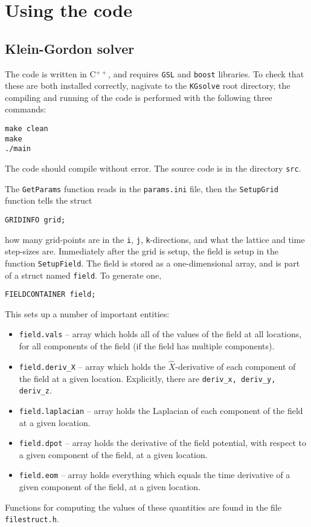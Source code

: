 \documentclass[amsmath,amssymb,12pt, eqsecnum]{revtex4}
\newcommand\codeRed[1]{\textcolor[rgb]{1,0,0}{{\tt #1}}}
\newcommand\codeBlue[1]{\textcolor[rgb]{0,0,1}{{\tt #1}}}
\begin{document}
\section{Using the code}
\subsection{Klein-Gordon solver}
The code is written in C$^{++}$, and requires {\tt GSL} and {\tt boost} libraries. To check that these are both installed correctly, nagivate to the {\tt KGsolve} root directory, the compiling and running of the code is performed with the following three commands:
\begin{verbatim}
make clean
make
./main
\end{verbatim}
The code should compile without error. The source code is in the directory {\tt src}.

The \codeBlue{GetParams} function reads in the {\tt params.ini} file, then the \codeBlue{SetupGrid} function tells the struct
\begin{verbatim}
GRIDINFO grid;
\end{verbatim}
how many grid-points are in the {\tt i}, {\tt j}, {\tt k}-directions, and what the lattice and time step-sizes are. Immediately after the grid is setup, the field is setup in the function \codeBlue{SetupField}. The  field  is stored as a one-dimensional array, and is part of a struct named {\tt field}. To generate one, 
\begin{verbatim}
FIELDCONTAINER field;
\end{verbatim}
This sets up a number of important entities:
\begin{itemize}
\item {\tt field.vals} --    array which holds all of the values of the field at all locations, for all components of the field (if the field has multiple components). 
\item {\tt field.deriv\_X} --    array which holds the $\hat{X}$-derivative of each component of the field at a given location. Explicitly, there are {\tt deriv\_x, deriv\_y, deriv\_z}.
\item {\tt field.laplacian} --   array holds the Laplacian of each component of the field at a given location.
\item {\tt field.dpot} --   array holds the derivative of the field potential, with respect to a given component of the field, at a given location.
\item {\tt field.eom} --   array holds everything which equals the time derivative of a given component of the field, at a given location.
\end{itemize}
Functions for computing the values of these quantities are found in the file \codeRed{filestruct.h}.
\end{document}
